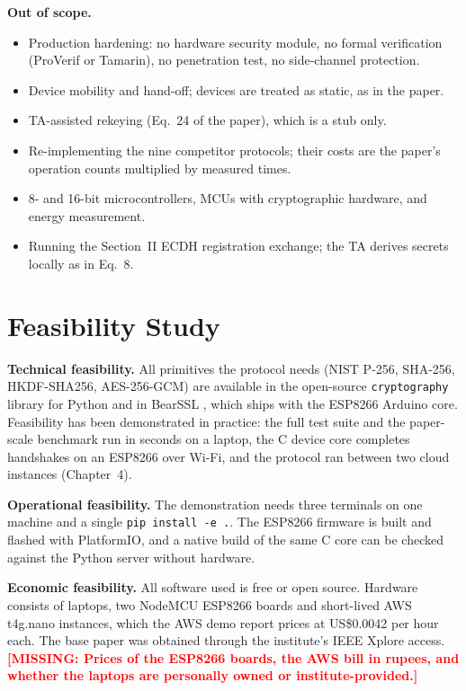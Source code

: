 \documentclass[12pt,a4paper,oneside]{report}
\numberwithin{equation}{chapter}
\newcommand{\MISSING}[1]{\textcolor{red}{\textbf{[MISSING: #1]}}}
\begin{document}
\textbf{Out of scope.}
\begin{itemize}[nosep]
  \item Production hardening: no hardware security module, no formal verification (ProVerif or Tamarin), no penetration test, no side-channel protection.
  \item Device mobility and hand-off; devices are treated as static, as in the paper.
  \item TA-assisted rekeying (Eq.~24 of the paper), which is a stub only.
  \item Re-implementing the nine competitor protocols; their costs are the paper's operation counts multiplied by measured times.
  \item 8- and 16-bit microcontrollers, MCUs with cryptographic hardware, and energy measurement.
  \item Running the Section~II ECDH registration exchange; the TA derives secrets locally as in Eq.~8.
\end{itemize}

\section{Feasibility Study}
\textbf{Technical feasibility.} All primitives the protocol needs (NIST P-256, SHA-256, HKDF-SHA256, AES-256-GCM) are available in the open-source \texttt{cryptography} library \cite{pyca_cryptography} for Python and in BearSSL \cite{bearssl}, which ships with the ESP8266 Arduino core. Feasibility has been demonstrated in practice: the full test suite and the paper-scale benchmark run in seconds on a laptop, the C device core completes handshakes on an ESP8266 over Wi-Fi, and the protocol ran between two cloud instances (Chapter~4).

\textbf{Operational feasibility.} The demonstration needs three terminals on one machine and a single \texttt{pip install -e .}. The ESP8266 firmware is built and flashed with PlatformIO, and a native build of the same C core can be checked against the Python server without hardware.

\textbf{Economic feasibility.} All software used is free or open source. Hardware consists of laptops, two NodeMCU ESP8266 boards and short-lived AWS t4g.nano instances, which the AWS demo report prices at US\$0.0042 per hour each. The base paper was obtained through the institute's IEEE Xplore access. \MISSING{Prices of the ESP8266 boards, the AWS bill in rupees, and whether the laptops are personally owned or institute-provided.}
\end{document}
